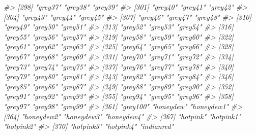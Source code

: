 \documentclass[
]{book}
\newenvironment{Shaded}{\begin{snugshade}}{\end{snugshade}}
\newcommand{\CommentTok}[1]{\textcolor[rgb]{0.56,0.35,0.01}{\textit{#1}}}
\begin{document}
\begin{Shaded}
\begin{Highlighting}[]
\CommentTok{\#\textgreater{} [298] "grey37"               "grey38"               "grey39"              }
\CommentTok{\#\textgreater{} [301] "grey40"               "grey41"               "grey42"              }
\CommentTok{\#\textgreater{} [304] "grey43"               "grey44"               "grey45"              }
\CommentTok{\#\textgreater{} [307] "grey46"               "grey47"               "grey48"              }
\CommentTok{\#\textgreater{} [310] "grey49"               "grey50"               "grey51"              }
\CommentTok{\#\textgreater{} [313] "grey52"               "grey53"               "grey54"              }
\CommentTok{\#\textgreater{} [316] "grey55"               "grey56"               "grey57"              }
\CommentTok{\#\textgreater{} [319] "grey58"               "grey59"               "grey60"              }
\CommentTok{\#\textgreater{} [322] "grey61"               "grey62"               "grey63"              }
\CommentTok{\#\textgreater{} [325] "grey64"               "grey65"               "grey66"              }
\CommentTok{\#\textgreater{} [328] "grey67"               "grey68"               "grey69"              }
\CommentTok{\#\textgreater{} [331] "grey70"               "grey71"               "grey72"              }
\CommentTok{\#\textgreater{} [334] "grey73"               "grey74"               "grey75"              }
\CommentTok{\#\textgreater{} [337] "grey76"               "grey77"               "grey78"              }
\CommentTok{\#\textgreater{} [340] "grey79"               "grey80"               "grey81"              }
\CommentTok{\#\textgreater{} [343] "grey82"               "grey83"               "grey84"              }
\CommentTok{\#\textgreater{} [346] "grey85"               "grey86"               "grey87"              }
\CommentTok{\#\textgreater{} [349] "grey88"               "grey89"               "grey90"              }
\CommentTok{\#\textgreater{} [352] "grey91"               "grey92"               "grey93"              }
\CommentTok{\#\textgreater{} [355] "grey94"               "grey95"               "grey96"              }
\CommentTok{\#\textgreater{} [358] "grey97"               "grey98"               "grey99"              }
\CommentTok{\#\textgreater{} [361] "grey100"              "honeydew"             "honeydew1"           }
\CommentTok{\#\textgreater{} [364] "honeydew2"            "honeydew3"            "honeydew4"           }
\CommentTok{\#\textgreater{} [367] "hotpink"              "hotpink1"             "hotpink2"            }
\CommentTok{\#\textgreater{} [370] "hotpink3"             "hotpink4"             "indianred"           }

\end{Highlighting}
\end{Shaded}
\end{document}
